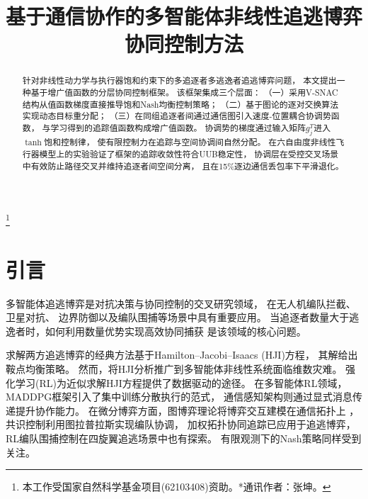 \documentclass[conference]{IEEEtran}
\newcommand\blfootnote[1]{%
  \begingroup
  \renewcommand\thefootnote{}\footnote{#1}%
  \addtocounter{footnote}{-1}%
  \endgroup
}
\begin{document}
\title{基于通信协作的多智能体非线性追逃博弈\\协同控制方法}

\author{
}

\maketitle

\begin{abstract}
针对非线性动力学与执行器饱和约束下的多追逐者多逃逸者追逃博弈问题，
本文提出一种基于增广值函数的分层协同控制框架。
该框架集成三个层面：
（一）采用V-SNAC结构从值函数梯度直接推导饱和Nash均衡控制策略；
（二）基于图论的逐对交换算法实现动态目标重分配；
（三）在同组追逐者间通过通信图引入速度-位置耦合协调势函数，
与学习得到的追踪值函数构成增广值函数。
协调势的梯度通过输入矩阵$g_j^T$进入$\tanh$饱和控制律，
使有限控制力在追踪与空间协调间自然分配。
在六自由度非线性飞行器模型上的实验验证了框架的追踪收敛性符合UUB稳定性，
协调层在受控交叉场景中有效防止路径交叉并维持追逐者间空间分离，
且在15\%逐边通信丢包率下平滑退化。
\end{abstract}

\blfootnote{
本工作受国家自然科学基金项目(62103408)资助。*通讯作者：张坤。
}

\section{引言}

多智能体追逃博弈是对抗决策与协同控制的交叉研究领域，
在无人机编队拦截\cite{b_zhang2023}、卫星对抗\cite{b_gong2020}、
边界防御\cite{b_shishika2020}以及编队围捕\cite{b_formrl2024}等场景中具有重要应用。
当追逐者数量大于逃逸者时，如何利用数量优势实现高效协同捕获
是该领域的核心问题\cite{b_isaacs,b_chen2016}。

求解两方追逃博弈的经典方法基于Hamilton--Jacobi--Isaacs (HJI)方程\cite{b_isaacs}，
其解给出鞍点均衡策略。
然而，将HJI分析推广到多智能体非线性系统面临维数灾难。
强化学习(RL)为近似求解HJI方程提供了数据驱动的途径\cite{b_lewis1998,b_lopez2020,b_xu2024}。
在多智能体RL领域，MADDPG\cite{b_maddpg}框架引入了集中训练分散执行的范式，
通信感知架构\cite{b_commrl2025}则通过显式消息传递提升协作能力。
在微分博弈方面，图博弈理论将博弈交互建模在通信拓扑上
\cite{b_lopez2020,b_graphgame2023}，
共识控制利用图拉普拉斯实现编队协调\cite{b_ren2005,b_olfati2004}，
加权拓扑协同追踪已应用于追逃博弈\cite{b_zhou2024}，
RL编队围捕控制在四旋翼追逃场景中也有探索\cite{b_formrl2024}。
有限观测下的Nash策略同样受到关注\cite{b_graphswap}。
\end{document}
